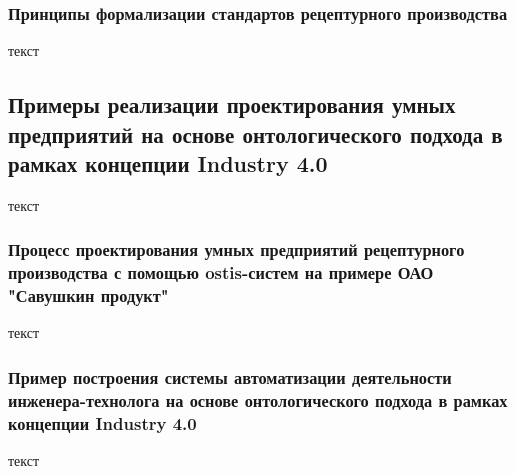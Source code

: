 \subsubsection{Принципы формализации стандартов рецептурного производства}

текст

\subsection{Примеры реализации проектирования умных предприятий на основе онтологического подхода в рамках концепции Industry 4.0}

текст

\subsubsection{Процесс проектирования умных предприятий рецептурного производства с помощью ostis-систем на примере ОАО "Савушкин продукт"}

текст

\subsubsection{Пример построения системы автоматизации деятельности инженера-технолога на основе онтологического подхода в рамках концепции Industry 4.0}

текст


%
